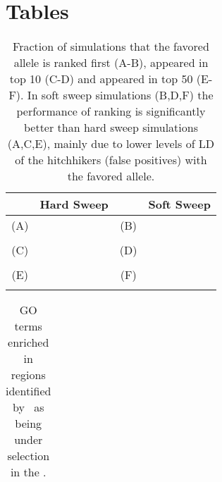 \section*{Tables}

\begin{table}[H]
	\begin{tabular}{cc|cc}
		& Hard Sweep&  & Soft Sweep\\
		\hline
		(A) & & (B) & \\
		& {}
		& &{ }\\
		\hline
		(C) & & (D) & \\
		& {}
		& &{ }\\
		\hline
		(E) & & (F) & \\
		& {}
		& &{ }\\
		\hline
	\end{tabular}
	\caption{Fraction of simulations that the favored allele is ranked first (A-B), 
	appeared in top 10 (C-D) and appeared in top 50 (E-F). In soft sweep 
	simulations (B,D,F) the performance of ranking is significantly better than 
	hard sweep simulations (A,C,E), mainly due to lower levels of LD of the 
	hitchhikers (false positives) with the favored allele.}\label{tab:rank}
\end{table}

\begin{table}[H]
	\begin{tabular}{c}
		
	\end{tabular}
	\caption{GO terms enriched in regions identified by \comale\ as being under 
	selection in the \data.}\label{tab:Fisher}
\end{table}

